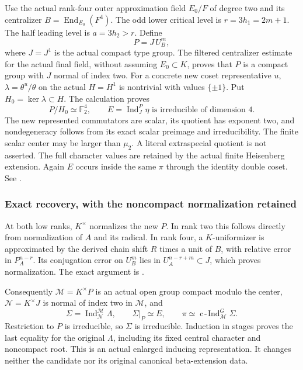 Use the actual rank-four outer approximation field \(E_0/F\) of degree
two and its centralizer \(B=\operatorname{End}_{E_0}(F^4)\). The odd
lower critical level is \(r=3h_1=2m+1\). The half leading level is
\(a=3h_2>r\). Define \[
P=J\,U_B^m,
\] where \(J=J^1\) is the actual compact type group. The filtered
centralizer estimate for the actual final field, without assuming
\(E_0\subset K\), proves that \(P\) is a compact group with \(J\) normal
of index two. For a concrete new coset representative \(u\),
\(\lambda=\theta^u/\theta\) on the actual \(H=H^1\) is nontrivial with
values \(\{\pm1\}\). Put \(H_0=\ker\lambda\subset H\). The calculation
proves \[
P/H_0\simeq\mathbb F_2^4,\qquad
E=\operatorname{Ind}_J^P\eta\text{ is irreducible of dimension }4.
\] The new represented commutators are scalar, its quotient has exponent
two, and nondegeneracy follows from its exact scalar preimage and
irreducibility. The finite scalar center may be larger than \(\mu_2\). A literal extraspecial quotient is not asserted. The full character values
are retained by the actual finite Heisenberg extension. Again \(E\)
occurs inside the same \(\pi\) through the identity double coset. See
.

\hypertarget{dyadic_synthesis-exact-recovery-with-the-noncompact-normalization-retained}{%
\subsubsection{Exact recovery, with the noncompact normalization
retained}\label{dyadic_synthesis-exact-recovery-with-the-noncompact-normalization-retained}}

At both low ranks, \(K^\times\) normalizes the new \(P\). In rank two
this follows directly from normalization of \(A\) and its radical. In
rank four, a \(K\)-uniformizer is approximated by the derived chain
shift \(R\) times a unit of \(B\), with relative error in \(P_A^{n-r}\).
Its conjugation error on \(U_B^m\) lies in \(U_A^{n-r+m}\subset J\),
which proves normalization. The exact argument is
.

Consequently \(\mathcal M=K^\times P\) is an actual open group compact
modulo the center, \(\mathcal N=K^\times J\) is normal of index two in
\(\mathcal M\), and \[
\Sigma=\operatorname{Ind}_{\mathcal N}^{\mathcal M}\Lambda,
\qquad \Sigma|_P\simeq E,
\qquad
\boxed{\pi\simeq\operatorname{c\!-\!Ind}_{\mathcal M}^G\Sigma.}
\] Restriction to \(P\) is irreducible, so \(\Sigma\) is irreducible.
Induction in stages proves the last equality for the original
\(\Lambda\), including its fixed central character and noncompact root.
This is an actual enlarged inducing representation. It changes neither
the candidate nor its original canonical beta-extension data.

